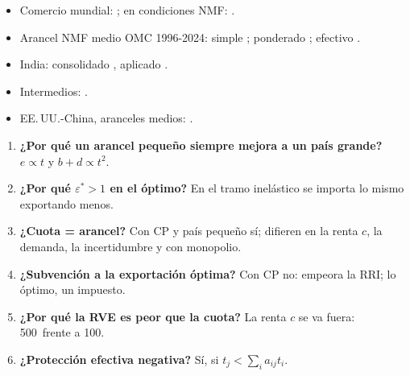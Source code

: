 \documentclass{article}
\begin{document}
\begin{columnas}
\anexorepaso
{}
\begin{itemize}
\item Comercio mundial: ; en condiciones NMF: .
\item Arancel NMF medio OMC 1996-2024: simple ; ponderado ; efectivo .
\item India: consolidado , aplicado .
\item Intermedios: .
\item EE.\,UU.-China, aranceles medios: .
\end{itemize}
\begin{enumerate}
\item \textbf{¿Por qué un arancel pequeño siempre mejora a un país grande?} $e\propto t$ y $b+d\propto t^2$.
\item \textbf{¿Por qué $\varepsilon^*>1$ en el óptimo?} En el tramo inelástico se importa lo mismo exportando menos.
\item \textbf{¿Cuota = arancel?} Con CP y país pequeño sí; difieren en la renta $c$, la demanda, la incertidumbre y con monopolio.
\item \textbf{¿Subvención a la exportación óptima?} Con CP no: empeora la RRI; lo óptimo, un impuesto.
\item \textbf{¿Por qué la RVE es peor que la cuota?} La renta $c$ se va fuera: 500~frente a 100.
\item \textbf{¿Protección efectiva negativa?} Sí, si $t_j<\sum_ia_{ij}t_i$.
\end{enumerate}
\begin{trampa}
\begin{itemize}

\end{itemize}
\end{trampa}
\end{columnas}
\end{document}
